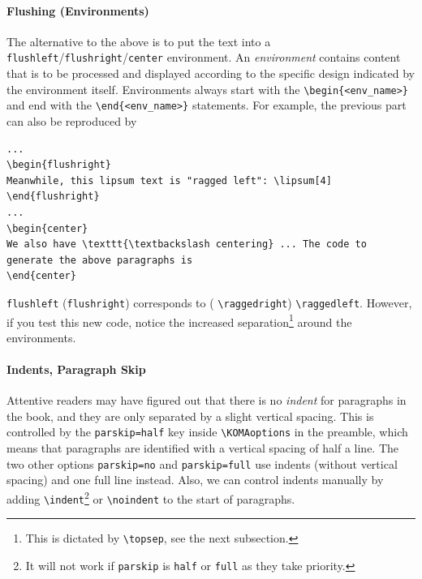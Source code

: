 \paragraph{Flushing (Environments)}
The alternative to the above is to put the text into a \verb|flushleft|/\verb|flushright|/\verb|center| environment. An \textit{environment} contains content that is to be processed and displayed according to the specific design indicated by the environment itself. Environments always start with the \texttt{\textbackslash begin\{<env\_name>\}} and end with the \texttt{\textbackslash end\{<env\_name>\}} statements. For example, the previous part can also be reproduced by
\begin{lstlisting}
...
\begin{flushright}
Meanwhile, this lipsum text is "ragged left": \lipsum[4]
\end{flushright}
...
\begin{center}
We also have \texttt{\textbackslash centering} ... The code to generate the above paragraphs is
\end{center}
\end{lstlisting}
\texttt{flushleft} (\texttt{flushright}) corresponds to ( \texttt{\textbackslash raggedright}) \texttt{\textbackslash raggedleft}. However, if you test this new code, notice the increased separation\footnote{This is dictated by \texttt{\textbackslash topsep}, see the next subsection.} around the environments. 

\paragraph{Indents, Paragraph Skip}
Attentive readers may have figured out that there is no \textit{indent} for paragraphs in the book, and they are only separated by a slight vertical spacing. This is controlled by the \verb|parskip=half| key inside \texttt{\textbackslash KOMAoptions} in the preamble, which means that paragraphs are identified with a vertical spacing of half a line. The two other options \verb|parskip=no| and \verb|parskip=full| use indents (without vertical spacing) and one full line instead. Also, we can control indents manually by adding \texttt{\textbackslash indent}\footnote{It will not work if \texttt{parskip} is \texttt{half} or \texttt{full} as they take priority.} or \texttt{\textbackslash noindent} to the start of paragraphs.


